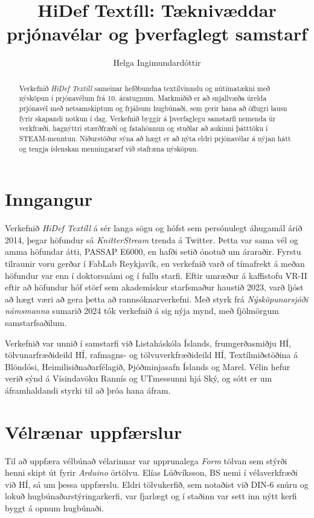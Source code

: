\documentclass[a4paper,12pt]{article}
\title{HiDef Textíll: Tæknivæddar prjónavélar og þverfaglegt samstarf}
\author{Helga Ingimundardóttir}
\date{}
\begin{document}
\maketitle

\begin{abstract}
Verkefnið \emph{HiDef Textíll} sameinar hefðbundna textílvinnslu og nútímatækni með
nýsköpun í prjónavélum frá 10. áratugnum. Markmiðið er að snjallvæða úrelda prjónavél
með netsamskiptum og frjálsum hugbúnaði, sem gerir hana að öflugri lausn fyrir
skapandi notkun í dag. Verkefnið byggir á þverfaglegu samstarfi nemenda úr verkfræði,
hagnýttri stærðfræði og fatahönnun og stuðlar að aukinni þátttöku í STEAM-menntun.
Niðurstöður sýna að hægt er að nýta eldri prjónavélar á nýjan hátt og tengja íslenskan
menningararf við stafræna nýsköpun.
\end{abstract}

\section{Inngangur}
Verkefnið \emph{HiDef Textíll} á sér langa sögu og hófst sem persónulegt áhugamál árið
2014, þegar höfundur sá \emph{KnitterStream} \cite{knitterstream} trenda á Twitter.
Þetta var sama vél og amma höfundar átti, PASSAP E6000, en hafði setið ónotuð um
áraraðir. Fyrstu tilraunir voru gerðar í FabLab Reykjavík, en verkefnið varð of tímafrekt
á meðan höfundur var enn í doktorsnámi og í fullu starfi. Eftir umræður á kaffistofu VR-II 
eftir að höfundur hóf störf sem akademískur starfsmaður haustið 2023, varð ljóst að hægt 
væri að gera þetta að rannsóknarverkefni. Með styrk frá \emph{Nýsköpunarsjóði námsmanna}
sumarið 2024 tók verkefnið á sig nýja mynd, með fjölmörgum samstarfsaðilum.

Verkefnið var unnið í samstarfi við Listaháskóla Íslands, frumgerðasmiðju HÍ,
tölvunarfræðideild HÍ, rafmagns- og tölvuverkfræðideild HÍ, Textílmiðstöðina á Blöndósi,
Heimilisiðnaðarfélagið, Þjóðminjasafn Íslands og Marel. Vélin hefur verið sýnd á
Vísindavöku Rannís og UTmessunni hjá Ský, og sótt er um áframhaldandi styrki til að
þróa hana áfram.

\section{Vélrænar uppfærslur}
Til að uppfæra vélbúnað vélarinnar var upprunalega \emph{Form} tölvan sem stýrði henni
skipt út fyrir \emph{Arduino} örtölvu. Elías Lúðvíksson, BS nemi í vélaverkfræði við HÍ,
sá um þessa uppfærslu. Eldri tölvukerfið, sem notaðist við DIN-6 snúru og lokuð
hugbúnaðarstýringarkerfi, var fjarlægt og í staðinn var sett inn nýtt kerfi byggt á
opnum hugbúnaði.
\end{document}
